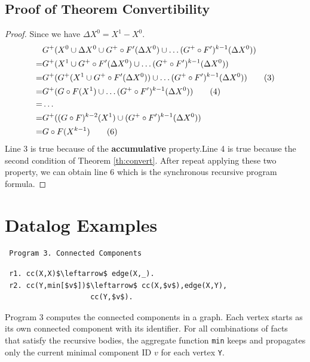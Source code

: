 \begin{appendix}
 \subsection{Proof of Theorem Convertibility}
 \label{sec:app:proof:convert}
 \begin{proof}
 Since we have $\Delta X^0=X^1-X^0$.
 \begin{align}
&G^+(X^0\cup \Delta X^0 \cup G^+\circ F'(\Delta X^0)\cup \ldots (G^+ \circ F')^{k-1}(\Delta X^0 )) \notag\\
=&G^+(X^1 \cup G^+\circ F'(\Delta X^0  )\cup \ldots (G^+ \circ F')^{k-1}(\Delta X^0  )) \notag\\
=&G^+(G^+(X^1\cup G^+\circ F'(\Delta X^0  ))\cup \ldots (G^+ \circ F')^{k-1}(\Delta X^0 )) \tag{3}\\
=&G^+(G\circ F(X^1)\cup \ldots (G^+ \circ F')^{k-1}(\Delta X^0 )) \tag{4}\\
=&\ldots \notag\\
=&G^+((G\circ F)^{k-2}(X^1)\cup(G^+ \circ F')^{k-1}(\Delta X^0 )) \notag\\
=&G\circ F(X^{k-1})\tag{6}
 \end{align}
Line 3 is true because of the \textbf{accumulative} property.Line 4 is true because the second condition of Theorem \ref{th:convert}. After repeat applying these two property, we can obtain line 6 which is the synchronous recursive program formula. 
 \end{proof}
 

 \section{Datalog Examples}
 \label{sec:app:example}
 
 \begin{verbatim}
 Program 3. Connected Components
 \end{verbatim}\vspace{-0.1in}\small
 \begin{lstlisting}
 r1. cc(X,X)$\leftarrow$ edge(X,_).
 r2. cc(Y,min[$v$])$\leftarrow$ cc(X,$v$),edge(X,Y),
                    cc(Y,$v$).
 \end{lstlisting}
 \normalsize
 
 Program 3 computes the connected components in a graph. Each vertex starts as its own connected component with its identifier. For all combinations of facts that satisfy the recursive bodies, the aggregate function \texttt{min} keeps and propagates only the current minimal component ID $v$ for each vertex \texttt{Y}.

\end{appendix}
